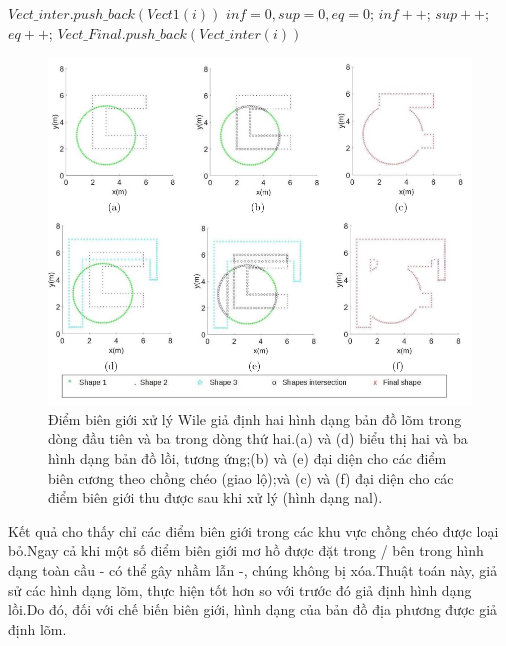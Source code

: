 \documentclass[11pt,openany]{book}
\begin{document}
\begin{algorimth}[H]
\begin{algorithm}[H]
\begin{algorithmic}[1]
        \ENDIF
        \ENDFOR
        \STATE $Vect\_inter.push\_back(Vect1(i))$
        \ENDIF
        \ENDFOR
        \STATE $inf=0,sup=0, eq=0$;
        \STATE $inf++$;
        \STATE $sup++$;
        \ELSE
        \STATE $eq++$;
        \ENDIF
        \ENDIF
        \ENDFOR
        \STATE $Vect\_Final.push\_back(Vect\_inter(i))$
        \ENDIF
        \ENDFOR
    \end{algorithmic}
\end{algorithm}
\begin{figure}[H]
    \centering
    \includegraphics[scale=0.4]{assets/3_7.png}
    \caption{Điểm biên giới xử lý Wile giả định hai hình dạng bản đồ lõm trong dòng đầu tiên và ba trong dòng thứ hai.(a) và (d) biểu thị hai và ba hình dạng bản đồ lồi, tương ứng;(b) và (e) đại diện cho các điểm biên cương theo chồng chéo (giao lộ);và (c) và (f) đại diện cho các điểm biên giới thu được sau khi xử lý (hình dạng nal).}
    \label{fig:3.7}
\end{figure}
Kết quả cho thấy chỉ các điểm biên giới trong các khu vực chồng chéo được loại bỏ.Ngay cả khi một số điểm biên giới mơ hồ được đặt trong / bên trong hình dạng toàn cầu - có thể gây nhầm lẫn -, chúng không bị xóa.Thuật toán này, giả sử các hình dạng lõm, thực hiện tốt hơn so với trước đó giả định hình dạng lồi.Do đó, đối với chế biến biên giới, hình dạng của bản đồ địa phương được giả định lõm.

\end{algorimth}
\end{document}
